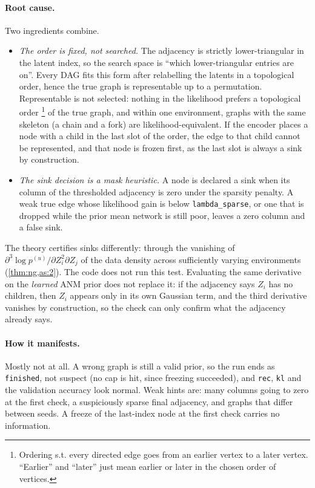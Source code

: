 \paragraph{Root cause.}
Two ingredients combine.
\begin{itemize}[leftmargin=1.5em]
\item \emph{The order is fixed, not searched.} The adjacency is strictly lower-triangular in the 
      latent index, so the search space is ``which lower-triangular entries are on''. Every DAG fits 
      this form after relabelling the latents in a topological order, hence the true graph is 
      representable up to a permutation. Representable is not selected: nothing in the likelihood 
      prefers a topological order 
      \footnote{Ordering s.t. every directed edge goes from an earlier vertex to a later vertex.
      ``Earlier'' and ``later'' just mean earlier or later in the chosen order of vertices.}
      of the true graph, and within one environment, graphs with the 
      same skeleton (a chain and a fork) are likelihood-equivalent. If the encoder places a node 
      with a child in the last slot of the order, the edge to that child cannot be represented, and 
      that node is frozen first, as the last slot is always a sink by construction.
\item \emph{The sink decision is a mask heuristic.} A node is declared a sink when its column of the
      thresholded adjacency is zero under the sparsity penalty. A weak true edge whose likelihood 
      gain is below \texttt{lambda\_sparse}, or one that is dropped while the prior mean network is 
      still poor, leaves a zero column and a false sink.
\end{itemize}
The theory certifies sinks differently: through the vanishing of
$\partial^3\log p^{(u)}/\partial Z_i^2\partial Z_j$ of the data density across sufficiently varying
environments (\cref{thm:ng,as:2}). The code does not run this test. Evaluating the same derivative 
on the \emph{learned} ANM prior does not replace it: if the adjacency says $Z_i$ has no children, 
then $Z_i$ appears only in its own Gaussian term, and the third derivative vanishes by construction, 
so the check can only confirm what the adjacency already says.

\paragraph{How it manifests.}
Mostly not at all. A wrong graph is still a valid prior, so the run ends as \texttt{finished}, not
suspect (no cap is hit, since freezing succeeded), and \texttt{rec}, \texttt{kl} and the validation
accuracy look normal. Weak hints are: many columns going to zero at the first check, a suspiciously 
sparse final adjacency, and graphs that differ between seeds. A freeze of the last-index node at the 
first check carries no information.

